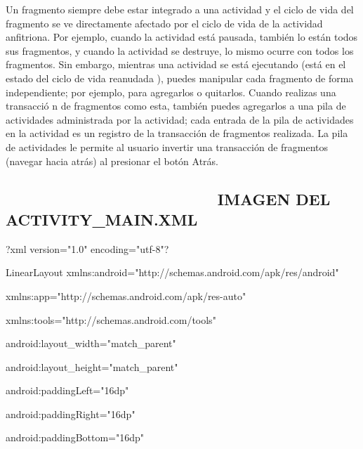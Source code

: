 \documentclass{article}
\begin{document}
\bigskip 

Un fragmento siempre debe estar integrado a una actividad y el ciclo de vida
del fragmento se ve directamente afectado por el ciclo de vida de la
actividad anfitriona. Por ejemplo, cuando la actividad est\'{a} pausada,
tambi\'{e}n lo est\'{a}n todos sus fragmentos, y cuando la actividad se
destruye, lo mismo ocurre con todos los fragmentos. Sin embargo, mientras
una actividad se est\'{a} ejecutando (est\'{a} en el estado del ciclo de
vida reanudada ), puedes manipular cada fragmento de forma independiente;
por ejemplo, para agregarlos o quitarlos. Cuando realizas una transacci\'{o}%
n de fragmentos como esta, tambi\'{e}n puedes agregarlos a una pila de
actividades administrada por la actividad; cada entrada de la pila de
actividades en la actividad es un registro de la transacci\'{o}n de
fragmentos realizada. La pila de actividades le permite al usuario invertir
una transacci\'{o}n de fragmentos (navegar hacia atr\'{a}s) al presionar el
bot\'{o}n Atr\'{a}s.

\bigskip 

\subsection{ \ \ \ \ \ \ \ \ \ \ \ \ \ \ \ \ \ \ \ \ \ \ \ \ \ IMAGEN DEL
ACTIVITY\_MAIN.XML}


\bigskip 

\bigskip \TEXTsymbol{<}?xml version="1.0" encoding="utf-8"?\TEXTsymbol{>}

\TEXTsymbol{<}LinearLayout
xmlns:android="http://schemas.android.com/apk/res/android"

xmlns:app="http://schemas.android.com/apk/res-auto"

xmlns:tools="http://schemas.android.com/tools"

android:layout\_width="match\_parent"

android:layout\_height="match\_parent"

android:paddingLeft="16dp"

android:paddingRight="16dp"

android:paddingBottom="16dp"
\end{document}
